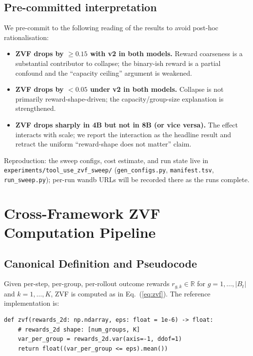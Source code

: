 \documentclass{article}
\begin{document}
\subsection{Pre-committed interpretation}
We pre-commit to the following reading of the results to avoid post-hoc
rationalisation:
\begin{itemize}
  \item \textbf{ZVF drops by \(\geq 0.15\) with v2 in both models.}
        Reward coarseness is a substantial contributor to collapse;
        the binary-ish reward is a partial confound and the
        ``capacity ceiling'' argument is weakened.
  \item \textbf{ZVF drops by \(<0.05\) under v2 in both models.}
        Collapse is not primarily reward-shape-driven; the
        capacity/group-size explanation is strengthened.
  \item \textbf{ZVF drops sharply in 4B but not in 8B (or vice versa).}
        The effect interacts with scale; we report the interaction as
        the headline result and retract the uniform ``reward-shape does
        not matter'' claim.
\end{itemize}

Reproduction: the sweep configs, cost estimate, and run state live in
\texttt{experiments/tool\_use\_zvf\_sweep/} (\texttt{gen\_configs.py},
\texttt{manifest.tsv}, \texttt{run\_sweep.py}); per-run wandb URLs will be
recorded there as the runs complete.
 \providecommand{\artifactstatusword}{released}
\section{Cross-Framework ZVF Computation Pipeline}
\label{sec:appendix:zvf-pipeline}

\subsection{Canonical Definition and Pseudocode}

Given per-step, per-group, per-rollout outcome rewards
$r_{g,k} \in \mathbb{R}$ for $g=1,\ldots,|B_t|$ and $k=1,\ldots,K$, ZVF
is computed as in Eq.~(\ref{eq:zvf}). The reference implementation is:
\begin{verbatim}
def zvf(rewards_2d: np.ndarray, eps: float = 1e-6) -> float:
    # rewards_2d shape: [num_groups, K]
    var_per_group = rewards_2d.var(axis=-1, ddof=1)
    return float((var_per_group <= eps).mean())
\end{verbatim}
\end{document}
